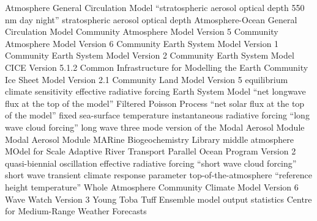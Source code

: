 \documentclass[draft]{agujournal2019}
\begin{document}
\begin{acronyms}
   Atmosphere General Circulation Model  ``stratospheric
  aerosol optical depth 550 nm day night''  stratospheric aerosol optical depth
   Atmosphere-Ocean General Circulation Model  Community Atmosphere
  Model Version 5  Community Atmosphere Model Version 6  Community
  Earth System Model Version 1  Community Earth System Model Version 2
   Community Earth System Model  CICE Version 5.1.2 
  Common Infrastructure for Modelling the Earth  Community Ice Sheet Model
  Version 2.1  Community Land Model Version 5  equilibrium climate
  sensitivity  effective radiative forcing  Earth System Model
   ``net longwave flux at the top of the model''  Filtered Poisson
  Process  ``net solar flux at the top of the model''  fixed
  sea-surface temperature  instantaneous radiative forcing  ``long
  wave cloud forcing''  long wave  three mode version of the Modal
  Aerosol Module  Modal Aerosol Module  MARine Biogeochemistry
  Library  middle atmosphere  MOdel for Scale Adaptive River
  Transport  Parallel Ocean Program Version 2  quasi-biennial
  oscillation  effective radiative forcing  ``short wave cloud
  forcing''  short wave  transient climate response parameter
   top-of-the-atmosphere  ``reference height temperature''
   Whole Atmosphere Community Climate Model Version 6  Wave Watch
  Version 3  Young Toba Tuff  Ensemble model output statistics
   Centre for Medium-Range Weather Forecasts
\end{acronyms}

\end{document}
